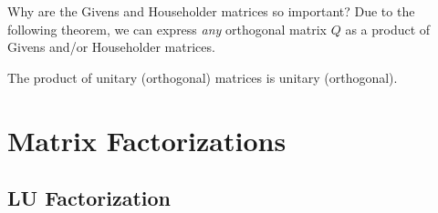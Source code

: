 Why are the Givens and Householder matrices so important? Due to the following theorem, we can express {\em any} orthogonal matrix $Q$ as a product of Givens and/or Householder matrices.
\begin{theorem}\label{theorem:unitaryproduct}
The product of unitary (orthogonal) matrices is unitary (orthogonal).
\end{theorem}

\section{Matrix Factorizations}

\subsection{LU Factorization}

